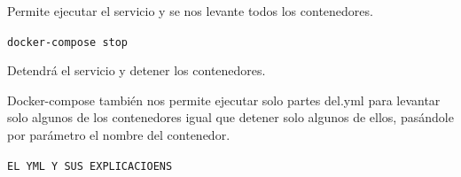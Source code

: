 Permite ejecutar el servicio y se nos levante todos los contenedores.

\begin{center}
\texttt{docker-compose stop}
\end{center} 

Detendrá el servicio y detener los contenedores. 
\newline

Docker-compose también nos permite ejecutar solo partes del.yml para levantar solo algunos de los contenedores igual que detener solo algunos de ellos, pasándole por parámetro el nombre del contenedor. 
\begin{center}
\texttt{EL YML Y SUS EXPLICACIOENS}
\end{center} 